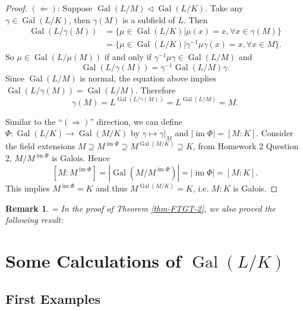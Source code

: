 \documentclass[11pt]{book}
\newtheorem{remark}[theorem]{Remark}
\newcommand{\im}{\mathop{\mathrm{im}}}
\begin{document}
\begin{proof}
    $(\Leftarrow)$: Suppose $\operatorname{Gal}(L /M)\lhd \operatorname{Gal}(L /K)$. Take any $\gamma\in \operatorname{Gal}(L /K)$, then $\gamma(M)$ is a subfield of $L$. Then 
    \[
    \begin{aligned}
        \operatorname{Gal}(L/ \gamma(M))&=\{\mu\in \operatorname{Gal}(L /K)|\mu(x)=x,\forall x\in \gamma(M)\}\\
        &=\{\mu\in \operatorname{Gal}(L /K)|\gamma^{-1}\mu\gamma(x)=x,\forall x\in M\}.
    \end{aligned}
    \]
    So $\mu\in \operatorname{Gal}(L /\mu(M))$ if and only if $\gamma^{-1}\mu\gamma\in \operatorname{Gal}(L /M)$ and 
    \[
    \operatorname{Gal}(L /\gamma(M))=\gamma^{-1}\operatorname{Gal}(L /M)\gamma. 
    \]
    Since $\operatorname{Gal}(L /M)$ is normal, the equation above implies $\operatorname{Gal}(L /\gamma(M))=\operatorname{Gal}(L /M)$. Therefore 
    \[
    \gamma(M)=L^{\operatorname{Gal}(L /\gamma(M))}=L^{\operatorname{Gal}(L /M)}=M. 
    \]

    Similar to the ``$(\Rightarrow)$'' direction, we can define $\Phi: \operatorname{Gal}(L /K)\to \operatorname{Gal}(M /K)$ by $\gamma\mapsto \gamma|_{M}$ and $\left| \im \Phi \right| =[M:K]$. 
    Consider the field extensions $M\supseteq M^{\im \Phi}\supseteq M^{\operatorname{Gal}(M /K)}\supseteq K$, from Homework 2 Question 2, $M /M^{\im \Phi}$ is Galois. Hence 
    \[
    [M:M^{\im \Phi}]=\left| \operatorname{Gal}(M /M^{\im\Phi}) \right| = \left| \im \Phi \right| =[M:K].
    \]
    This implies $M^{\im \Phi}=K$ and thus $M^{\operatorname{Gal}(M /K)}=K$, i.e. $M :K$ is Galois. 
\end{proof}

\begin{remark}\label{rmk-GaloisExtensionEquiFixedField}
=    In the proof of Theorem \ref{thm-FTGT-2}, we also proved the following result: 
    \begin{center}
    \end{center}
\end{remark}


\chapter{Some Calculations of $\operatorname{Gal}(L/K)$}
\section{First Examples}
\end{document}
